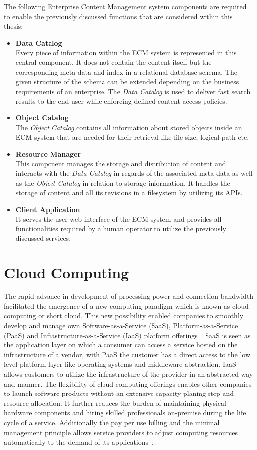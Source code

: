 The following Enterprise Content Management system components are required to enable the previously discussed functions that are considered within this thesis:
\begin{itemize}
    \item[]{\textbf{Data Catalog}\\
    Every piece of information within the ECM system is represented in this central component.
    It does not contain the content itself but the corresponding meta data and index in a relational database schema.
    The given structure of the schema can be extended depending on the business requirements of an enterprise.
    The \textit{Data Catalog} is used to deliver fast search results to the end-user while enforcing defined content access policies.
    }
    \item[]{\textbf{Object Catalog}\\
    The \textit{Object Catalog} contains all information about stored objects inside an ECM system that are needed for their retrieval like file size, logical path etc.
    }
    \item[]{\textbf{Resource Manager}\\
    This component manages the storage and distribution of content and interacts with the \textit{Data Catalog} in regards of the associated meta data as well as the \textit{Object Catalog} in relation to storage information.
    It handles the storage of content and all its revisions in a filesystem by utilizing its APIs.
    }
    \item[]{\textbf{Client Application}\\
    It serves the user web interface of the ECM system and provides all functionalities required by a human operator to utilize the previously discussed services.
    }
\end{itemize}

\section{Cloud Computing}
The rapid advance in development of processing power and connection bandwidth facilitated the emergence of a new computing paradigm which is known as cloud computing or short cloud.
This new possibility enabled companies to smoothly develop and manage own Software-as-a-Service (SaaS), Platform-as-a-Service (PaaS) and Infrastructure-as-a-Service (IaaS) platform offerings~\cite{cloud1}.
SaaS is seen as the application layer on which a consumer can access a service hosted on the infrastructure of a vendor, with PaaS the customer has a direct access to the low level platform layer like operating systems and middleware abstraction. IaaS allows customers to utilize the infrastructure of the provider in an abstracted way and manner.
The flexibility of cloud computing offerings enables other companies to launch software products without an extensive capacity planing step and resource allocation.
It further reduces the burden of maintaining physical hardware components and hiring skilled professionals on-premise during the life cycle of a service.
Additionally the pay per use billing and the minimal management principle allows service providers to adjust computing resources automatically to the demand of its applications~\cite{cloud2}.


